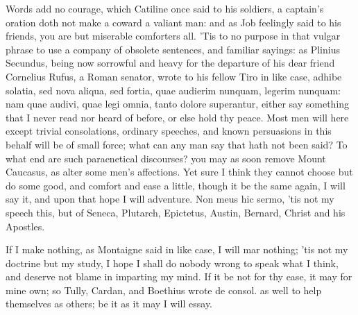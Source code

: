 {Words add no courage, which Catiline once said to his soldiers, a
captain's oration doth not make a coward a valiant man: and as Job
 feelingly said to his friends, you are but miserable comforters
all. 'Tis to no purpose in that vulgar phrase to use a company of
obsolete sentences, and familiar sayings: as Plinius Secundus,
being now sorrowful and heavy for the departure of his dear friend
Cornelius Rufus, a Roman senator, wrote to his fellow Tiro in like
case, adhibe solatia, sed nova aliqua, sed fortia, quae audierim
nunquam, legerim nunquam: nam quae audivi, quae legi omnia, tanto
dolore superantur, either say something that I never read nor heard of
before, or else hold thy peace. Most men will here except trivial
consolations, ordinary speeches, and known persuasions in this behalf
will be of small force; what can any man say that hath not been said?
To what end are such paraenetical discourses? you may as soon remove
Mount Caucasus, as alter some men's affections. Yet sure I think they
cannot choose but do some good, and comfort and ease a little, though
it be the same again, I will say it, and upon that hope I will
adventure. Non meus hic sermo, 'tis not my speech this, but of
Seneca, Plutarch, Epictetus, Austin, Bernard, Christ and his Apostles.

If I make nothing, as Montaigne said in like case, I will mar
nothing; 'tis not my doctrine but my study, I hope I shall do nobody
wrong to speak what I think, and deserve not blame in imparting my
mind. If it be not for thy ease, it may for mine own; so Tully, Cardan,
and Boethius wrote de consol. as well to help themselves as others; be
it as it may I will essay.

}
